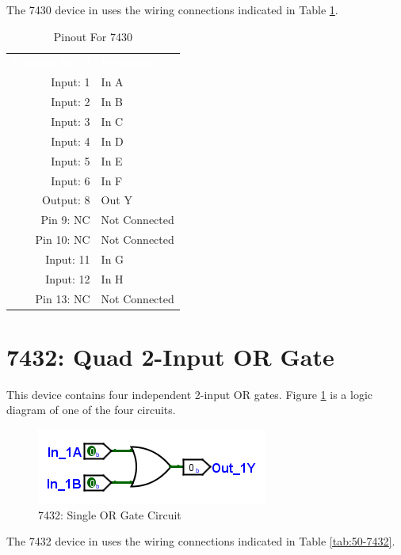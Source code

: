The 7430 device in \LE uses the wiring connections indicated in Table \ref{tab:50-7430}.

\begin{table}[H]
	\sffamily
	\newcommand{\head}[1]{\textcolor{white}{\textbf{#1}}}		
	\begin{center}
		\begin{tabular}{rl} 
			\rowcolor{black!75}
			\head{Logisim Label} & \head{Function} \\
			Input: 1    & In A \\
			Input: 2    & In B \\
			Input: 3    & In C \\
			Input: 4    & In D \\
			Input: 5    & In E \\
			Input: 6    & In F \\
			Output: 8   & Out Y \\
			Pin 9: NC   & Not Connected \\
			Pin 10: NC  & Not Connected \\
			Input: 11   & In G \\
			Input: 12   & In H  \\
			Pin 13: NC  & Not Connected  \\
		\end{tabular}
	\end{center}
	\caption{Pinout For 7430}
	\label{tab:50-7430}
\end{table}

\section{7432: Quad 2-Input OR Gate}

This device contains four independent 2-input OR gates. Figure \ref{fig:app_ttl-7432} is a logic diagram of one of the four circuits.

\begin{figure}[H]
	\centering
	\includegraphics{gfx/app_ttl-7432}
	\caption{7432: Single OR Gate Circuit}
	\label{fig:app_ttl-7432}
\end{figure}

The 7432 device in \LE uses the wiring connections indicated in Table \ref{tab:50-7432}.


